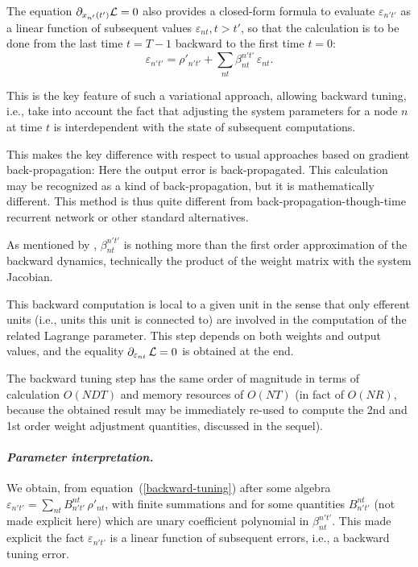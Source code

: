 The equation $\partial_{x_{n'}(t')} {\cal L}  = 0$ also provides a closed-form formula to evaluate $\varepsilon_{n't'}$ as a linear function of subsequent values $\varepsilon_{nt}, t > t'$, so that the calculation is to be done from the last time $t = T-1$ backward to the first time $t = 0$:
\begin{equation} \label{backward-tuning}
\varepsilon_{n't'} = \rho'_{n't'} + \sum_{nt} \beta_{nt}^{n't'} \, \varepsilon_{nt}.
\end{equation}

This is the key feature of such a variational approach, allowing backward tuning, i.e., take into account the fact that adjusting the system parameters for a node $n$ at time $t$ is interdependent with the state of subsequent computations.

This makes the key difference with respect to usual approaches based on gradient back-propagation: Here the output error is back-propagated. 
This calculation may be recognized as a kind of back-propagation, but it is mathematically different.
This method is thus quite different from back-propagation-though-time recurrent network or other standard alternatives. 


As mentioned by \cite{cun_theoretical_1988}, $\beta_{nt}^{n't'}$ is nothing more than the first order approximation of the backward dynamics, technically the product of the weight matrix with the system Jacobian.

This backward computation is local to a given unit in the sense that only efferent units (i.e., units this unit is connected to) are involved in the computation of the related Lagrange parameter. This step depends on both weights and output values, and the equality $\partial_{\varepsilon_{nt}} \, {\cal L} = 0$ is obtained at the end.

The backward tuning step has the same order of magnitude in terms of calculation $O(N D T)$  and memory resources of $O(N T)$ (in fact of $O(N R)$, because the obtained result may be immediately re-used to compute the 2nd and 1st order weight adjustment quantities, discussed in the sequel). 

\paragraph{\em Parameter interpretation.}

We obtain, from equation~(\ref{backward-tuning}) after some algebra $\varepsilon_{n't'} = \sum_{nt} B_{n't'}^{nt} \, \rho'_{nt}$, with finite summations and for some quantities $B_{n't'}^{nt}$ (not made explicit here) which are unary coefficient polynomial in $\beta_{nt}^{n't'}$. This made explicit the fact $\varepsilon_{n't'}$ is a linear function of subsequent errors, i.e., a backward tuning error.

